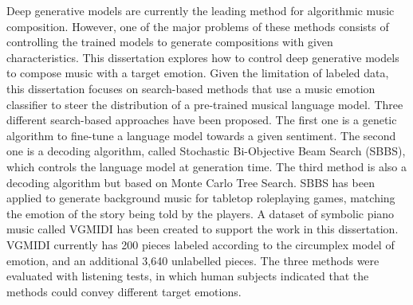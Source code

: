 Deep generative models are currently the leading method for algorithmic music composition. However, one of the major problems of these methods consists of controlling the trained models to generate compositions with given characteristics. This dissertation explores how to control deep generative models to compose music with a target emotion. Given the limitation of labeled data, this dissertation focuses on search-based methods that use a music emotion classifier to steer the distribution of a pre-trained musical language model. Three different search-based approaches have been proposed. The first one is a genetic algorithm to fine-tune a language model towards a given sentiment. The second one is a decoding algorithm, called Stochastic Bi-Objective Beam Search (SBBS), which controls the language model at generation time. The third method is also a decoding algorithm but based on Monte Carlo Tree Search. SBBS has been applied to generate background music for tabletop roleplaying games, matching the emotion of the story being told by the players. A dataset of symbolic piano music called VGMIDI has been created to support the work in this dissertation. VGMIDI currently has 200 pieces labeled according to the circumplex model of emotion, and an additional 3,640 unlabelled pieces. The three methods were evaluated with listening tests, in which human subjects indicated that the methods could convey different target emotions.

